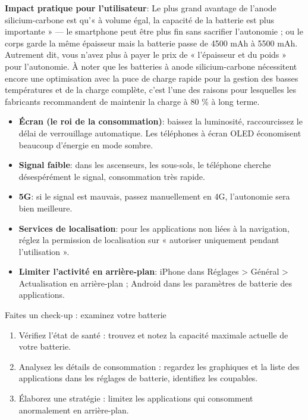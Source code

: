 \textbf{Impact pratique pour l'utilisateur}: Le plus grand avantage de l'anode silicium-carbone est qu'« à volume égal, la capacité de la batterie est plus importante » — le smartphone peut être plus fin sans sacrifier l'autonomie ; ou le corps garde la même épaisseur mais la batterie passe de 4500 mAh à 5500 mAh. Autrement dit, vous n'avez plus à payer le prix de « l'épaisseur et du poids » pour l'autonomie. À noter que les batteries à anode silicium-carbone nécessitent encore une optimisation avec la puce de charge rapide pour la gestion des basses températures et de la charge complète, c'est l'une des raisons pour lesquelles les fabricants recommandent de maintenir la charge à 80 \% à long terme.


\begin{itemize}
  \item \textbf{Écran (le roi de la consommation)}: baissez la luminosité, raccourcissez le délai de verrouillage automatique. Les téléphones à écran OLED économisent beaucoup d'énergie en mode sombre.
  \item \textbf{Signal faible}: dans les ascenseurs, les sous-sols, le téléphone cherche désespérément le signal, consommation très rapide.
  \item \textbf{5G}: si le signal est mauvais, passez manuellement en 4G, l'autonomie sera bien meilleure.
  \item \textbf{Services de localisation}: pour les applications non liées à la navigation, réglez la permission de localisation sur « autoriser uniquement pendant l'utilisation ».
  \item \textbf{Limiter l'activité en arrière-plan}: iPhone dans Réglages > Général > Actualisation en arrière-plan ; Android dans les paramètres de batterie des applications.
\end{itemize}

\begin{tcbpractice}{Faites un check-up : examinez votre batterie}
\begin{enumerate}
  \item Vérifiez l'état de santé : trouvez et notez la capacité maximale actuelle de votre batterie.
  \item Analysez les détails de consommation : regardez les graphiques et la liste des applications dans les réglages de batterie, identifiez les coupables.
  \item Élaborez une stratégie : limitez les applications qui consomment anormalement en arrière-plan.
\end{enumerate}

\end{tcbpractice}
